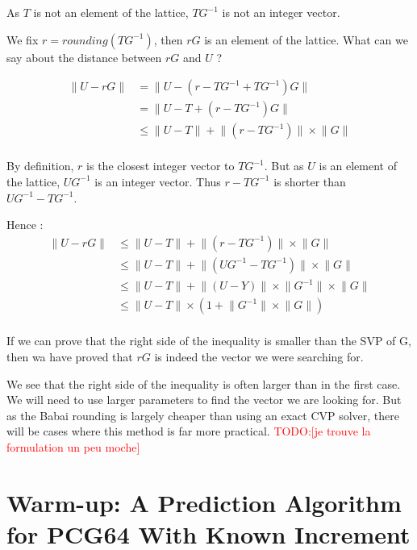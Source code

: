 \documentclass[preprint,svgnames]{iacrtrans}
\newcommand{\todo}[1]{\textcolor{red}{TODO:[#1]}}
\begin{document}
\medskip

As \(T\) is not an element of the lattice, \(TG^{-1}\) is not an integer vector.

We fix \(r = rounding(TG^{-1}) \), then \(rG\) is an element of the lattice. What can we say about the distance between \(rG\) and \(U\) ?

\begin{align*}
\lVert U - rG \rVert &= \lVert U - (r-TG^{-1} + TG^{-1})G \rVert\\
&= \lVert U - T + (r-TG^{-1})G \rVert\\
&\leqslant \lVert U - T \rVert + \lVert(r-TG^{-1})\rVert \times \lVert G\rVert\\	
\end{align*}

By definition, \(r\) is the closest integer vector to \(TG^{-1}\). But as \(U\) is an element of the lattice, \(UG^{-1}\) is an integer vector. Thus \(r-TG^{-1}\) is shorter than \(UG^{-1}-TG^{-1}\).

Hence :
\begin{align*}
\lVert U - rG \rVert &\leqslant \lVert U - T \rVert + \lVert(r-TG^{-1})\rVert \times \lVert G\rVert\\	
&\leqslant \lVert U - T \rVert + \lVert(UG^{-1}-TG^{-1})\rVert \times \lVert G\rVert\\	
&\leqslant \lVert U - T \rVert + \lVert(U-Y)\rVert \times \lVert G^{-1} \rVert  \times \lVert G\rVert\\
& 	\leqslant \lVert U - T \rVert \times (1 +\lVert G^{-1} \rVert  \times \lVert G\rVert )\\
\end{align*}

If we can prove that the right side of the inequality is smaller than the SVP of G, then wa have proved that \(rG\) is indeed the vector we were searching for.

We see that  the right side of the inequality is often larger than in the first case. We will need to use larger parameters to find the vector we are looking for. But as the Babai rounding is largely cheaper than using an exact CVP solver, there will be cases where this method is far more practical. \todo{je trouve la formulation un peu moche}

\section{Warm-up: A Prediction Algorithm for \textsf{PCG64} With Known Increment}
\label{sec:Cknown}
\end{document}
